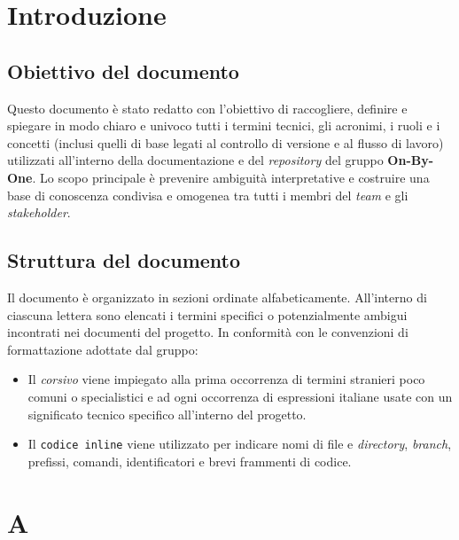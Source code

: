 \documentclass[11pt, a4paper]{article}
\begin{document}
\section{Introduzione}

\subsection{Obiettivo del documento}
Questo documento è stato redatto con l'obiettivo di raccogliere, definire e spiegare in modo chiaro e univoco tutti i termini tecnici, gli acronimi, i ruoli e i concetti (inclusi quelli di base legati al controllo di versione e al flusso di lavoro) utilizzati all'interno della documentazione e del \textit{repository} del gruppo \textbf{On-By-One}. Lo scopo principale è prevenire ambiguità interpretative e costruire una base di conoscenza condivisa e omogenea tra tutti i membri del \textit{team} e gli \textit{stakeholder}.

\subsection{Struttura del documento}
Il documento è organizzato in sezioni ordinate alfabeticamente. All'interno di ciascuna lettera sono elencati i termini specifici o potenzialmente ambigui incontrati nei documenti del progetto. In conformità con le convenzioni di formattazione adottate dal gruppo:
\begin{itemize}
    \item Il \textit{corsivo} viene impiegato alla prima occorrenza di termini stranieri poco comuni o specialistici e ad ogni occorrenza di espressioni italiane usate con un significato tecnico specifico all'interno del progetto.
    \item Il \texttt{codice inline} viene utilizzato per indicare nomi di file e \textit{directory}, \textit{branch}, prefissi, comandi, identificatori e brevi frammenti di codice.
\end{itemize}

\newpage


\section*{A}
\end{document}
